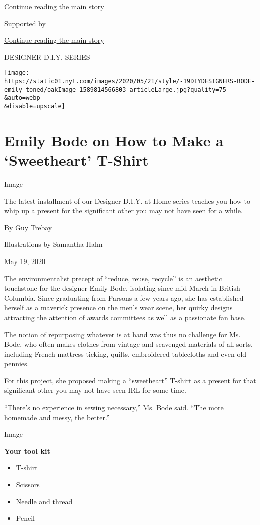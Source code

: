 \protect\hyperlink{after-top}{Continue reading the main story}

Supported by

\protect\hyperlink{after-sponsor}{Continue reading the main story}

DESIGNER D.I.Y. SERIES

\texttt{[image: https://static01.nyt.com/images/2020/05/21/style/-19DIYDESIGNERS-BODE-emily-toned/oakImage-1589814566803-articleLarge.jpg?quality=75\\\&auto=webp\\\&disable=upscale]}

\hypertarget{emily-bode-on-how-to-make-a-sweetheart-t-shirt}{%
\section{Emily Bode on How to Make a `Sweetheart'
T-Shirt}\label{emily-bode-on-how-to-make-a-sweetheart-t-shirt}}

Image

The latest installment of our Designer D.I.Y. at Home series teaches you
how to whip up a present for the significant other you may not have seen
for a while.

By \href{https://www.nytimes.com/by/guy-trebay}{Guy Trebay}

Illustrations by Samantha Hahn

May 19, 2020

The environmentalist precept of ``reduce, reuse, recycle'' is an
aesthetic touchstone for the designer Emily Bode, isolating since
mid-March in British Columbia. Since graduating from Parsons a few years
ago, she has established herself as a maverick presence on the men's
wear scene, her quirky designs attracting the attention of awards
committees as well as a passionate fan base.

The notion of repurposing whatever is at hand was thus no challenge for
Ms. Bode, who often makes clothes from vintage and scavenged materials
of all sorts, including French mattress ticking, quilts, embroidered
tablecloths and even old pennies.

For this project, she proposed making a ``sweetheart'' T-shirt as a
present for that significant other you may not have seen IRL for some
time.

``There's no experience in sewing necessary,'' Ms. Bode said. ``The more
homemade and messy, the better.''

Image

\textbf{Your tool kit}

\begin{itemize}
\item
  T-shirt
\item
  Scissors
\item
  Needle and thread
\item
  Pencil
\end{itemize}


